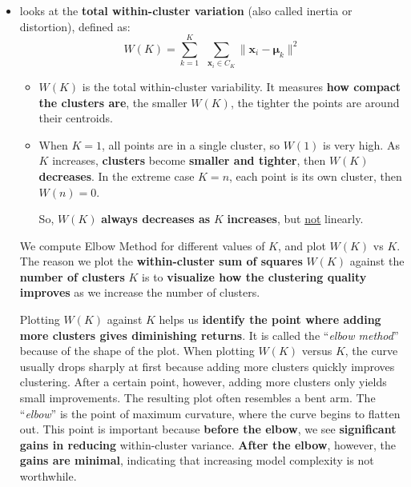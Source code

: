 \begin{itemize}
    \item {} looks at the \textbf{total within-cluster variation} (also called inertia or distortion), defined as:
    \begin{equation}
        W(K) = \displaystyle\sum_{k=1}^{K} \:\: \sum_{\mathbf{x}_{i} \in C_{K}} \| \mathbf{x}_{i} - \mathbf{\mu}_{k} \|^{2}
    \end{equation}
    \begin{itemize}
        \item $W(K)$ is the total within-cluster variability. It measures \textbf{how compact the clusters are}, the smaller $W(K)$, the tighter the points are around their centroids.
        \item When $K = 1$, all points are in a single cluster, so $W(1)$ is very high. As $K$ increases, \textbf{clusters} become \textbf{smaller and tighter}, then $W(K)$ \textbf{decreases}. In the extreme case $K = n$, each point is its own cluster, then $W(n) = 0$.
        
        So, $W(K)$ \textbf{always decreases as} $K$ \textbf{increases}, but \underline{not} linearly.
    \end{itemize}
    We compute Elbow Method for different values of $K$, and plot $W(K)$ vs $K$. The reason we plot the \textbf{within-cluster sum of squares} $W(K)$ against the \textbf{number of clusters} $K$ is to \textbf{visualize how the clustering quality improves} as we increase the number of clusters.

    Plotting $W(K)$ against $K$ helps us \textbf{identify the point where adding more clusters gives diminishing returns}. It is called the ``\emph{elbow method}'' because of the shape of the plot. When plotting $W(K)$ versus $K$, the curve usually drops sharply at first because adding more clusters quickly improves clustering. After a certain point, however, adding more clusters only yields small improvements. The resulting plot often resembles a bent arm. The ``\emph{elbow}'' is the point of maximum curvature, where the curve begins to flatten out. This point is important because \textbf{before the elbow}, we see \textbf{significant gains in reducing} within-cluster variance. \textbf{After the elbow}, however, the \textbf{gains are minimal}, indicating that increasing model complexity is not worthwhile.


\end{itemize}
